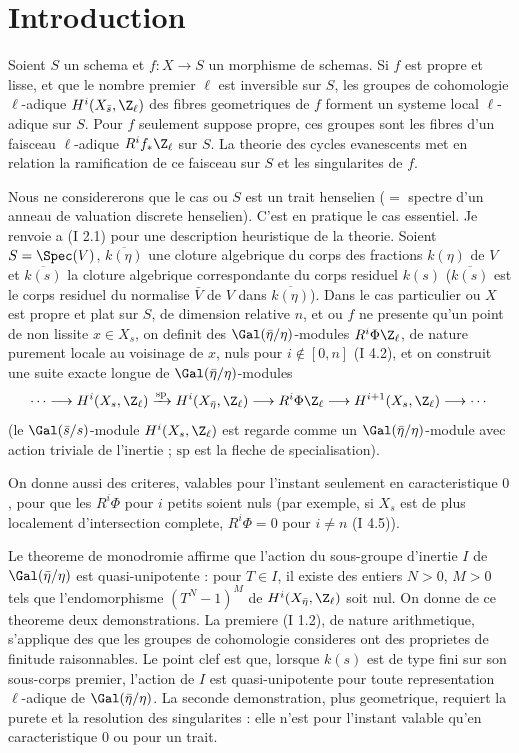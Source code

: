 \section*{Introduction}

Soient $S$ un schema et $f: X \to S$ un morphisme de schemas. Si $f$ est propre et lisse, et que le nombre premier $\ell$ est inversible sur $S$, les groupes de cohomologie $\ell$-adique $H^i(X_{\bar{s}}, \Z_\ell)$ des fibres geometriques de $f$ forment un systeme local $\ell$-adique sur $S$. Pour $f$ seulement suppose propre, ces groupes sont les fibres d'un faisceau $\ell$-adique $R^i f_* \Z_\ell$ sur $S$. La theorie des cycles evanescents met en relation la ramification de ce faisceau sur $S$ et les singularites de $f$.

Nous ne considererons que le cas ou $S$ est un trait henselien ($=$ spectre d'un anneau de valuation discrete henselien). C'est en pratique le cas essentiel. Je renvoie a (I 2.1) pour une description heuristique de la theorie. Soient $S = \Spec(V)$, $\overline{k(\eta)}$ une cloture algebrique du corps des fractions $k(\eta)$ de $V$ et $\overline{k(s)}$ la cloture algebrique correspondante du corps residuel $k(s)$ ($\overline{k(s)}$ est le corps residuel du normalise $\bar{V}$ de $V$ dans $\overline{k(\eta)}$). Dans le cas particulier ou $X$ est propre et plat sur $S$, de dimension relative $n$, et ou $f$ ne presente qu'un point de non lissite $x \in X_s$, on definit des $\Gal(\bar{\eta}/\eta)$-modules $R^i \Phi \Z_\ell$, de nature purement locale au voisinage de $x$, nuls pour $i \notin [0,n]$ (I 4.2), et on construit une suite exacte longue de $\Gal(\bar{\eta}/\eta)$-modules
\[
\cdots \longrightarrow H^i(X_s, \Z_\ell) \xrightarrow{\mathrm{sp}} H^i(X_{\bar{\eta}}, \Z_\ell) \longrightarrow R^i \Phi \Z_\ell \longrightarrow H^{i+1}(X_s, \Z_\ell) \longrightarrow \cdots
\]
(le $\Gal(\bar{s}/s)$-module $H^i(X_s, \Z_\ell)$ est regarde comme un $\Gal(\bar{\eta}/\eta)$-module avec action triviale de l'inertie ; $\mathrm{sp}$ est la fleche de specialisation).

On donne aussi des criteres, valables pour l'instant seulement en caracteristique $0$, pour que les $R^i \Phi$ pour $i$ petits soient nuls (par exemple, si $X_s$ est de plus localement d'intersection complete, $R^i \Phi = 0$ pour $i \neq n$ (I 4.5)).

\medskip

Le theoreme de monodromie affirme que l'action du sous-groupe d'inertie $I$ de $\Gal(\bar{\eta}/\eta)$ est quasi-unipotente : pour $T \in I$, il existe des entiers $N > 0$, $M > 0$ tels que l'endomorphisme $(T^N - 1)^M$ de $H^i(X_{\bar{\eta}}, \Z_\ell)$ soit nul. On donne de ce theoreme deux demonstrations. La premiere (I 1.2), de nature arithmetique, s'applique des que les groupes de cohomologie consideres ont des proprietes de finitude raisonnables. Le point clef est que, lorsque $k(s)$ est de type fini sur son sous-corps premier, l'action de $I$ est quasi-unipotente pour toute representation $\ell$-adique de $\Gal(\bar{\eta}/\eta)$. La seconde demonstration, plus geometrique, requiert la purete et la resolution des singularites : elle n'est pour l'instant valable qu'en caracteristique $0$ ou pour un trait.

